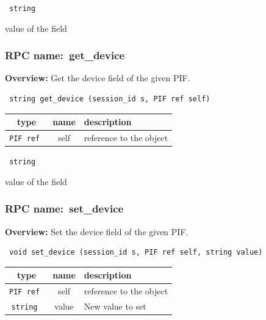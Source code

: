 {\tt 
string
}


value of the field
\vspace{0.3cm}
\vspace{0.3cm}
\vspace{0.3cm}
\subsubsection{RPC name:~get\_device}

{\bf Overview:} 
Get the device field of the given PIF.

\begin{verbatim} string get_device (session_id s, PIF ref self)\end{verbatim}



 
\vspace{0.3cm}
\begin{tabular}{|c|c|p{7cm}|}
 \hline
{\bf type} & {\bf name} & {\bf description} \\ \hline
{\tt PIF ref } & self & reference to the object \\ \hline 

\end{tabular}

\vspace{0.3cm}

{\tt 
string
}


value of the field
\vspace{0.3cm}
\vspace{0.3cm}
\vspace{0.3cm}
\subsubsection{RPC name:~set\_device}

{\bf Overview:} 
Set the device field of the given PIF.

\begin{verbatim} void set_device (session_id s, PIF ref self, string value)\end{verbatim}



 
\vspace{0.3cm}
\begin{tabular}{|c|c|p{7cm}|}
 \hline
{\bf type} & {\bf name} & {\bf description} \\ \hline
{\tt PIF ref } & self & reference to the object \\ \hline 

{\tt string } & value & New value to set \\ \hline 

\end{tabular}

